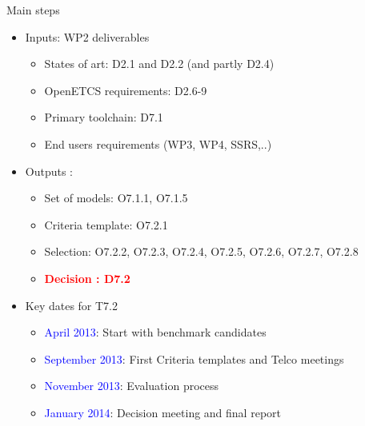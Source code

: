 \begin{frame}{Main steps}

  \begin{itemize}
  \item
    Inputs: WP2 deliverables
      \begin{itemize}
	  \item
 	   States of art: D2.1 and D2.2 (and partly D2.4)
 	  \item 
 	   OpenETCS requirements:  D2.6-9
 	  \item	
 	   Primary toolchain: D7.1
 	  \item
 	   End users requirements (WP3, WP4, SSRS,..) 
	  \end{itemize}
	  \pause
    \item
    Outputs :
      \begin{itemize}
      \item
      	Set of models: O7.1.1, O7.1.5
	  \item
	    Criteria template: O7.2.1
	  \item
	    Selection: O7.2.2, O7.2.3, O7.2.4, O7.2.5, O7.2.6, O7.2.7, O7.2.8
	  \item
	  	\textcolor{red}{\textbf{Decision : D7.2}}
  \end{itemize}
  \pause
  	\item
  		Key dates for T7.2
  	 \begin{itemize}
	  \item
 	   \textcolor{blue}{April 2013}: Start with benchmark candidates
 	  \item
 	   \textcolor{blue}{September 2013}: First Criteria templates and Telco meetings
	  \item
 	   \textcolor{blue}{November 2013}: Evaluation process
 	  \item
 	   \textcolor{blue}{January 2014}: Decision meeting and final report
	  \end{itemize}	
  
  \end{itemize}

\end{frame}


